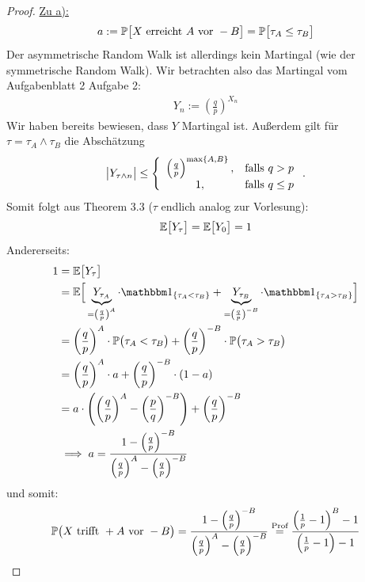 \documentclass[12pt,a4paper]{article}
\begin{document}
\begin{proof}
\underline{Zu a):}
\begin{align*}
a:=\P\big[ X\text{ erreicht }A\text{ vor }-B\big]=\P\big[\tau_A\leq\tau_B\big]
\end{align*}
Der asymmetrische Random Walk ist allerdings kein Martingal (wie der symmetrische Random Walk). Wir betrachten also das Martingal vom Aufgabenblatt 2 Aufgabe 2:
\begin{align*}
	Y_n := \left(\frac{q}{p}\right)^{X_n}
\end{align*}
Wir haben bereits bewiesen, dass $Y$ Martingal ist. Außerdem gilt für\\
$\tau=\tau_A\wedge\tau_B$ die Abschätzung
\begin{align*}
	\big|Y_{\tau\wedge n}\big|\leq
\left\lbrace\begin{array}{cl}
\left(\frac{q}{p}\right)^{\max\lbrace A,B\rbrace}, &\falls q>p\\
1, &\falls q\leq p
\end{array}\right..
\end{align*}
Somit folgt aus Theorem 3.3 ($\tau$ endlich analog zur Vorlesung):
\begin{align*}
\E\big[Y_\tau\big]=\E\big[Y_0\big]=1
\end{align*}
Andererseits: 
\begin{align*}
1&=\E\big[Y_\tau\big]\\
&=\E\Big[\underbrace{Y_{\tau_A}}_{=\left(\frac{q}{p}\right)^A}\cdot\indi_{\lbrace\tau_A<\tau_B\rbrace}+\underbrace{Y_{\tau_B}}_{=\left(\frac{q}{p}\right)^{-B}}\cdot\indi_{\lbrace\tau_A>\tau_B\rbrace}\Big]\\
&=\left(\frac{q}{p}\right)^A\cdot\P\big(\tau_A<\tau_B\big)+\left(\frac{q}{p}\right)^{-B}\cdot\P\big(\tau_A>\tau_B\big)\\
&=\left(\frac{q}{p}\right)^A\cdot a+ \left(\frac{q}{p}\right)^{-B}\cdot(1-a)\\
&=a\cdot\left(\left(\frac{q}{p}\right)^A - \left(\frac{p}{q}\right)^{-B}\right)+ \left(\frac{q}{p}\right)^{-B}\\
&\implies
a=\frac{1-\left(\frac{q}{p}\right)^{-B}}{\left(\frac{q}{p}\right)^A-\left(\frac{q}{p}\right)^{-B}}
\end{align*}
und somit:
\begin{align*}
\P\big(X\text{ trifft }+A\text{ vor }-B\big)
=\frac{1-\left(\frac{q}{p}\right)^{-B}}{\left(\frac{q}{p}\right)^A-\left(\frac{q}{p}\right)^{-B}}
\stackeq{\text{Prof}}
\frac{\left(\frac{1}{p}-1\right)^B-1}{\left(\frac{1}{p}-1\right)-1}
\end{align*}


\end{proof}
\end{document}
